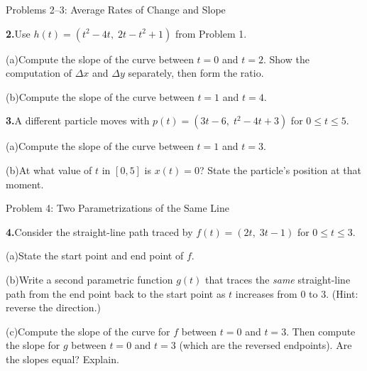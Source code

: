 \documentclass[10pt]{article}
\begin{document}
\begin{notesbox}{Problems 2--3: Average Rates of Change and Slope}

\textbf{2.}\quad Use $h(t) = (t^2 - 4t,\; 2t - t^2 + 1)$ from Problem 1.

\vspace{4pt}
(a)\quad Compute the slope of the curve between $t = 0$ and $t = 2$.
Show the computation of $\Delta x$ and $\Delta y$ separately, then
form the ratio.


\vspace{6pt}
(b)\quad Compute the slope of the curve between $t = 1$ and $t = 4$.


\vspace{0.06in}
\textbf{3.}\quad A different particle moves with
$p(t) = (3t - 6,\; t^2 - 4t + 3)$ for $0 \le t \le 5$.

\vspace{4pt}
(a)\quad Compute the slope of the curve between $t = 1$ and $t = 3$.


\vspace{4pt}
(b)\quad At what value of $t$ in $[0, 5]$ is $x(t) = 0$? State the
particle's position at that moment.


\end{notesbox}

\vspace{0.08in}

\begin{notesbox}{Problem 4: Two Parametrizations of the Same Line}

\textbf{4.}\quad Consider the straight-line path traced by
$f(t) = (2t,\; 3t - 1)$ for $0 \le t \le 3$.

\vspace{4pt}
(a)\quad State the start point and end point of $f$.

\writeline

\vspace{4pt}
(b)\quad Write a second parametric function $g(t)$ that traces the
\emph{same} straight-line path from the end point back to the start point
as $t$ increases from $0$ to $3$. (Hint: reverse the direction.)


\vspace{4pt}
(c)\quad Compute the slope of the curve for $f$ between $t = 0$ and $t = 3$.
Then compute the slope for $g$ between $t = 0$ and $t = 3$ (which are
the reversed endpoints). Are the slopes equal? Explain.


\end{notesbox}
\end{document}
